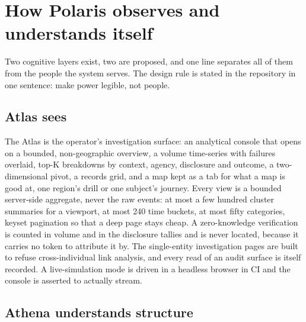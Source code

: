 \section{How Polaris observes and understands itself}
\label{sec:cognition}

Two cognitive layers exist, two are proposed, and one line separates all of them from the people
the system serves. The design rule is stated in the repository in one sentence: make power legible,
not people.


\subsection{Atlas sees}

The Atlas is the operator's investigation surface: an analytical console that opens on a bounded,
non-geographic overview, a volume time-series with failures overlaid, top-K breakdowns by context,
agency, disclosure and outcome, a two-dimensional pivot, a records grid, and a map kept as a tab for
what a map is good at, one region's drill or one subject's journey. Every view is a bounded
server-side aggregate, never the raw events: at most a few hundred cluster summaries for a viewport,
at most 240 time buckets, at most fifty categories, keyset pagination so that a deep page stays
cheap. A zero-knowledge verification is counted in volume and in the disclosure tallies and is never
located, because it carries no token to attribute it by. The single-entity investigation pages are
built to refuse cross-individual link analysis, and every read of an audit surface is itself
recorded. A live-simulation mode is driven in a headless browser in CI and the console is asserted to
actually stream. \sImpl

\subsection{Athena understands structure}

